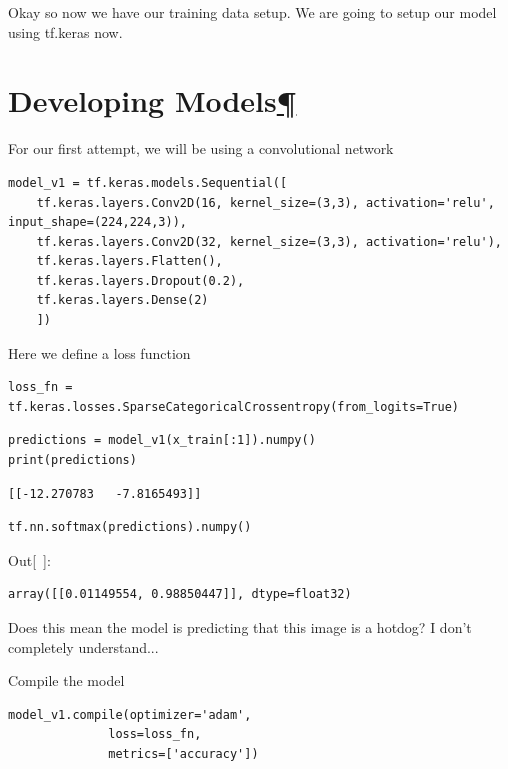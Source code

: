 \documentclass[
]{article}
\begin{document}
Okay so now we have our training data setup. We are going to setup our
model using tf.keras now.

\hypertarget{Developing-Models}{%
\section{\texorpdfstring{Developing
Models\protect\hyperlink{Developing-Models}{¶}}{Developing Models¶}}\label{Developing-Models}}

For our first attempt, we will be using a convolutional network

\begin{Verbatim}[frame=single]
model_v1 = tf.keras.models.Sequential([
    tf.keras.layers.Conv2D(16, kernel_size=(3,3), activation='relu', input_shape=(224,224,3)),
    tf.keras.layers.Conv2D(32, kernel_size=(3,3), activation='relu'),
    tf.keras.layers.Flatten(),
    tf.keras.layers.Dropout(0.2),
    tf.keras.layers.Dense(2)
    ])
\end{Verbatim}

Here we define a loss function

\begin{Verbatim}[frame=single]
loss_fn = tf.keras.losses.SparseCategoricalCrossentropy(from_logits=True)
\end{Verbatim}

\begin{Verbatim}[frame=single]
predictions = model_v1(x_train[:1]).numpy()
print(predictions)
\end{Verbatim}

\begin{verbatim}
[[-12.270783   -7.8165493]]
\end{verbatim}

\begin{Verbatim}[frame=single]
tf.nn.softmax(predictions).numpy()
\end{Verbatim}

Out{[}~{]}:

\begin{verbatim}
array([[0.01149554, 0.98850447]], dtype=float32)
\end{verbatim}

Does this mean the model is predicting that this image is a hotdog? I
don't completely understand...

Compile the model

\begin{Verbatim}[frame=single]
model_v1.compile(optimizer='adam',
              loss=loss_fn,
              metrics=['accuracy'])
\end{Verbatim}
\end{document}
